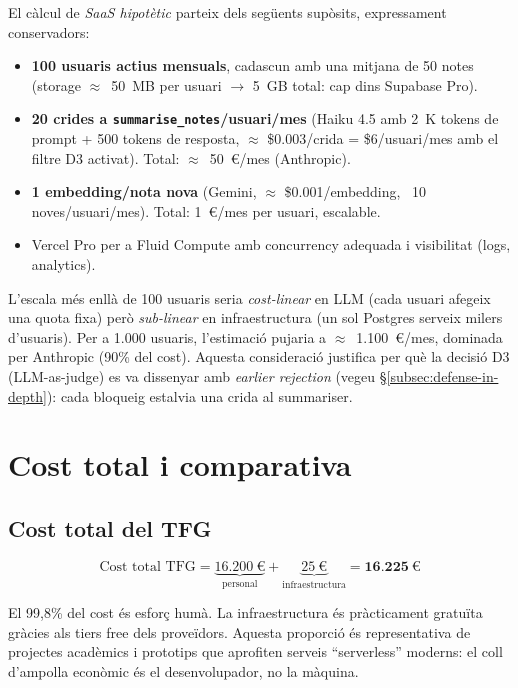 El càlcul de \emph{SaaS hipotètic} parteix dels següents supòsits, expressament conservadors:

\begin{itemize}
    \item \textbf{100 usuaris actius mensuals}, cadascun amb una mitjana de 50 notes (storage $\approx$~50~MB per usuari $\rightarrow$ 5~GB total: cap dins Supabase Pro).
    \item \textbf{20 crides a \texttt{summarise\_notes}/usuari/mes} (Haiku 4.5 amb 2~K tokens de prompt + 500 tokens de resposta, $\approx$ \$0.003/crida = \$6/usuari/mes amb el filtre D3 activat). Total: $\approx$~50~\euro{}/mes (Anthropic).
    \item \textbf{1 embedding/nota nova} (Gemini, $\approx$ \$0.001/embedding, ~10 noves/usuari/mes). Total: 1~\euro{}/mes per usuari, escalable.
    \item Vercel Pro per a Fluid Compute amb concurrency adequada i visibilitat (logs, analytics).
\end{itemize}

L'escala més enllà de 100 usuaris seria \emph{cost-linear} en LLM (cada usuari afegeix una quota fixa) però \emph{sub-linear} en infraestructura (un sol Postgres serveix milers d'usuaris). Per a 1.000 usuaris, l'estimació pujaria a $\approx$~1.100~\euro{}/mes, dominada per Anthropic (90\% del cost). Aquesta consideració justifica per què la decisió D3 (LLM-as-judge) es va dissenyar amb \emph{earlier rejection} (vegeu \S\ref{subsec:defense-in-depth}): cada bloqueig estalvia una crida al summariser.

\section{Cost total i comparativa}
\label{sec:cost-total}

\subsection{Cost total del TFG}

\begin{equation*}
    \text{Cost total TFG} = \underbrace{16{.}200~\euro{}}_{\text{personal}} + \underbrace{25~\euro{}}_{\text{infraestructura}} = \mathbf{16{.}225~\euro{}}
\end{equation*}

El 99{,}8\% del cost és esforç humà. La infraestructura és pràcticament gratuïta gràcies als tiers free dels proveïdors. Aquesta proporció és representativa de projectes acadèmics i prototips que aprofiten serveis ``serverless'' moderns: el coll d'ampolla econòmic és el desenvolupador, no la màquina.


